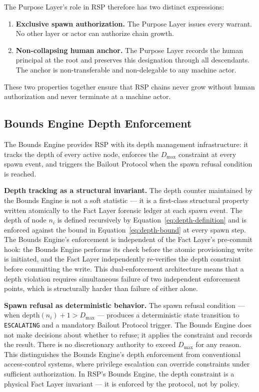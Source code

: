 The Purpose Layer's role in RSP therefore has two distinct expressions:

\begin{enumerate}
    \item[(PLA1)] \textbf{Exclusive spawn authorization.} The Purpose Layer issues every warrant. No other layer or actor can authorize chain growth.
    \item[(PLA2)] \textbf{Non-collapsing human anchor.} The Purpose Layer records the human principal at the root and preserves this designation through all descendants. The anchor is non-transferable and non-delegable to any machine actor.
\end{enumerate}

These two properties together ensure that RSP chains never grow without human authorization and never terminate at a machine actor.

\subsection{Bounds Engine Depth Enforcement}
\label{sec:rs-bounds-depth}

The Bounds Engine provides RSP with its depth management infrastructure: it tracks the depth of every active node, enforces the $D_{\max}$ constraint at every spawn event, and triggers the Bailout Protocol when the spawn refusal condition is reached.

\medskip
\noindent\textbf{Depth tracking as a structural invariant.} The depth counter maintained by the Bounds Engine is not a soft statistic --- it is a first-class structural property written atomically to the Fact Layer forensic ledger at each spawn event. The depth of node $n_i$ is defined recursively by Equation~\ref{eq:depth-definition} and is enforced against the bound in Equation~\ref{eq:depth-bound} at every spawn step. The Bounds Engine's enforcement is independent of the Fact Layer's pre-commit hook: the Bounds Engine performs its check before the atomic provisioning write is initiated, and the Fact Layer independently re-verifies the depth constraint before committing the write. This dual-enforcement architecture means that a depth violation requires simultaneous failure of two independent enforcement points, which is structurally harder than failure of either alone.

\medskip
\noindent\textbf{Spawn refusal as deterministic behavior.} The spawn refusal condition --- when $\text{depth}(n_i) + 1 > D_{\max}$ --- produces a deterministic state transition to \texttt{ESCALATING} and a mandatory Bailout Protocol trigger. The Bounds Engine does not make decisions about whether to refuse; it applies the constraint and records the result. There is no discretionary authority to exceed $D_{\max}$ for any reason. This distinguishes the Bounds Engine's depth enforcement from conventional access-control systems, where privilege escalation can override constraints under sufficient authorization. In RSP's Bounds Engine, the depth constraint is a physical Fact Layer invariant --- it is enforced by the protocol, not by policy.

